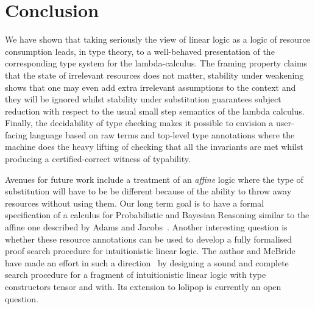 \documentclass[a4paper,UKenglish]{lipics-v2016}
\begin{document}
\section{Conclusion}

We have shown that taking seriously the view of linear logic as a
logic of resource consumption leads, in type theory, to a well-behaved
presentation of the corresponding type system for the lambda-calculus.
The framing property claims that the state of irrelevant resources does
not matter, stability under weakening shows that one may even add extra
irrelevant assumptions to the context and they will be ignored whilst
stability under substitution guarantees subject reduction with respect
to the usual small step semantics of the lambda calculus. Finally, the
decidability of type checking makes it possible to envision a user-facing
language based on raw terms and top-level type annotations where the
machine does the heavy lifting of checking that all the invariants are
met whilst producing a certified-correct witness of typability.

Avenues for future work include a treatment of an \emph{affine} logic
where the type of substitution will have to be be different because
of the ability to throw away resources without using them. Our long
term goal is to have a formal specification of a calculus for Probabilistic
and Bayesian Reasoning similar to the affine one described by Adams
and Jacobs~\cite{Adams2015Type}.
Another interesting question is whether these resource annotations
can be used to develop a fully formalised proof search procedure for
intuitionistic linear logic. The author and McBride have made an effort
in such a direction~\cite{Allais2015Proof} by designing a sound and
complete search procedure for a fragment of intuitionistic linear logic
with type constructors tensor and with. Its extension to lolipop is
currently an open question.






\appendix

\end{document}
